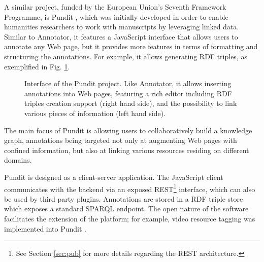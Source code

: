 A similar project, funded by the European Union's Seventh Framework Programme,
is Pundit \cite{ref:pundit}, which was initially developed in order to enable
humanities researchers to work with manuscripts by leveraging linked data.
Similar to Annotator, it features a JavaScript interface that allows users to
annotate any Web page, but it provides more features in terms of formatting and
structuring the annotations. For example, it allows generating RDF triples, as
exemplified in Fig. \ref{fig:pundit}.

\begin{figure}[!ht]
  \centering
  \caption[Interface of the Pundit project]
          {Interface of the Pundit project. Like Annotator, it allows
           inserting annotations into Web pages, featuring a rich editor
           including RDF triples creation support (right hand side), and
           the possibility to link various pieces of information (left hand
           side).}
  \label{fig:pundit}
\end{figure}

The main focus of Pundit is allowing users to collaboratively build a knowledge
graph, annotations being targeted not only at augmenting Web pages with
confined information, but also at linking various resources residing on
different domains.

Pundit is designed as a client-server application. The JavaScript client
communicates with the backend via an exposed REST\footnote{See Section
\ref{sec:pub} for more details regarding the REST architecture.} interface,
which can also be used by third party plugins. Annotations are stored in a RDF
triple store which exposes a standard SPARQL \cite{ref:sparql} endpoint. The
open nature of the software facilitates the extension of the platform; for
example, video resource tagging was implemented into Pundit
\cite{ref:punditvideo}.


